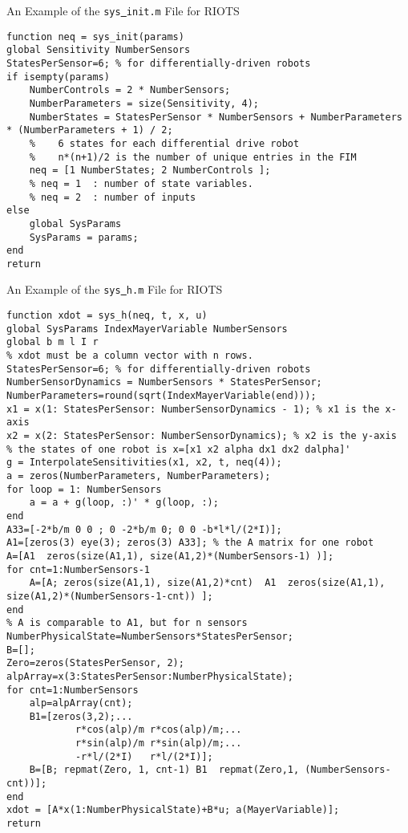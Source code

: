 \begin{table}[htb]
  \centering
  \caption{An Example of the \texttt{sys\protect\underline{\ }init.m} File for RIOTS} \label{t:egSysInit}
\lstset{language=Matlab, breaklines=true, numbers=left, texcl=false, mathescape=true}
\begin{lstlisting}
function neq = sys_init(params)
global Sensitivity NumberSensors
StatesPerSensor=6; % for differentially-driven robots
if isempty(params)
    NumberControls = 2 * NumberSensors;
    NumberParameters = size(Sensitivity, 4);
    NumberStates = StatesPerSensor * NumberSensors + NumberParameters * (NumberParameters + 1) / 2;
    %    6 states for each differential drive robot
    %    n*(n+1)/2 is the number of unique entries in the FIM
    neq = [1 NumberStates; 2 NumberControls ];
    % neq = 1  : number of state variables.
    % neq = 2  : number of inputs
else
    global SysParams
    SysParams = params;
end
return
\end{lstlisting}
\end{table}


\begin{table}[htb]
  \centering
  \caption{An Example of the \texttt{sys\protect\underline{\ }h.m} File for RIOTS}\label{t:egSysH}
  \lstset{language=Matlab, breaklines=true, numbers=left, texcl, mathescape=true }
\begin{lstlisting}
function xdot = sys_h(neq, t, x, u)
global SysParams IndexMayerVariable NumberSensors
global b m l I r
% xdot must be a column vector with n rows.
StatesPerSensor=6; % for differentially-driven robots
NumberSensorDynamics = NumberSensors * StatesPerSensor;
NumberParameters=round(sqrt(IndexMayerVariable(end)));
x1 = x(1: StatesPerSensor: NumberSensorDynamics - 1); % x1 is the x-axis
x2 = x(2: StatesPerSensor: NumberSensorDynamics); % x2 is the y-axis
% the states of one robot is x=[x1 x2 alpha dx1 dx2 dalpha]'
g = InterpolateSensitivities(x1, x2, t, neq(4));
a = zeros(NumberParameters, NumberParameters);
for loop = 1: NumberSensors
    a = a + g(loop, :)' * g(loop, :);
end
A33=[-2*b/m 0 0 ; 0 -2*b/m 0; 0 0 -b*l*l/(2*I)];
A1=[zeros(3) eye(3); zeros(3) A33]; % the A matrix for one robot
A=[A1  zeros(size(A1,1), size(A1,2)*(NumberSensors-1) )];
for cnt=1:NumberSensors-1
    A=[A; zeros(size(A1,1), size(A1,2)*cnt)  A1  zeros(size(A1,1), size(A1,2)*(NumberSensors-1-cnt)) ];
end
% A is comparable to A1, but for n sensors
NumberPhysicalState=NumberSensors*StatesPerSensor;
B=[];
Zero=zeros(StatesPerSensor, 2);
alpArray=x(3:StatesPerSensor:NumberPhysicalState);
for cnt=1:NumberSensors
    alp=alpArray(cnt);
    B1=[zeros(3,2);...
            r*cos(alp)/m r*cos(alp)/m;...
            r*sin(alp)/m r*sin(alp)/m;...
            -r*l/(2*I)   r*l/(2*I)];
    B=[B; repmat(Zero, 1, cnt-1) B1  repmat(Zero,1, (NumberSensors-cnt))];
end
xdot = [A*x(1:NumberPhysicalState)+B*u; a(MayerVariable)];
return
\end{lstlisting}
\end{table}


